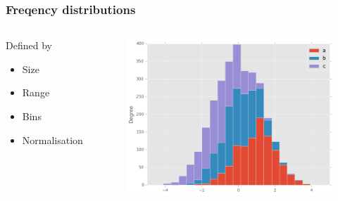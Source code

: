 \documentclass[10pt, compress]{beamer}
\begin{document}
\begin{frame}
    \frametitle{Freqency distributions}
    \begin{columns}
        \begin{block}{Defined by}
            \begin{itemize}
                \item Size
                \item Range
                \item Bins
                \item Normalisation
            \end{itemize}
        \end{block}
        \begin{block}{}
            \begin{figure}
                \begin{center}
                    \includegraphics[scale=0.3]{img/hist_new_stacked.png}
                \end{center}
            \end{figure}
        \end{block}
    \end{columns}
\end{frame}
\end{document}

